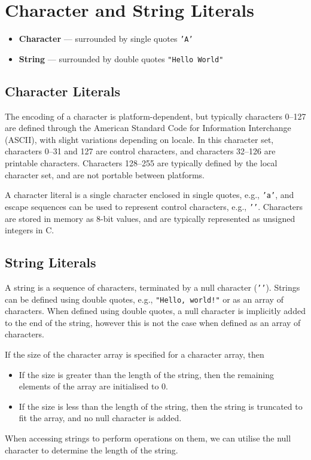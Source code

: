 \documentclass[a4paper]{report}
\begin{document}
\section{Character and String Literals}
\begin{itemize}
    \item \textbf{Character} --- surrounded by single quotes \texttt{'A'}
    \item \textbf{String} --- surrounded by double quotes \texttt{"Hello World"} %
\end{itemize}
\subsection{Character Literals}
The encoding of a character is platform-dependent, but typically characters 0--127 are defined through the American Standard Code for Information Interchange (ASCII),
with slight variations depending on locale. In this character set, characters 0--31 and 127 are control characters, and characters 32--126 are printable characters.
Characters 128--255 are typically defined by the local character set, and are not portable between platforms.

A character literal is a single character enclosed in single quotes, e.g., \texttt{'a'}, and escape sequences can be used to represent control characters, e.g., \texttt{'\n'}.
Characters are stored in memory as 8-bit values, and are typically represented as unsigned integers in C.
\subsection{String Literals}
A string is a sequence of characters, terminated by a null character (\texttt{'\0'}).
Strings can be defined using double quotes, e.g., \texttt{"Hello, world!"} or as an array of characters. When defined using double quotes, %
a null character is implicitly added to the end of the string, however this is not the case when defined as an array of characters.

If the size of the character array is specified for a character array, then
\begin{itemize}
    \item If the size is greater than the length of the string, then the remaining elements of the array are initialised to 0.
    \item If the size is less than the length of the string, then the string is truncated to fit the array, and no null character is added.
\end{itemize}
When accessing strings to perform operations on them, we can utilise the null character to determine the length of the string.
\end{document}
